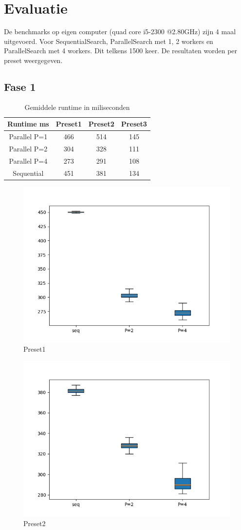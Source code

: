 \documentclass[]{article}
\begin{document}
\section{Evaluatie}
De benchmarks op eigen computer (quad core i5-2300 @2.80GHz) zijn 4 maal uitgevoerd. Voor SequentialSearch, ParallelSearch met 1, 2 workers en ParallelSearch met 4 workers. Dit telkens 1500 keer. De resultaten worden per preset weergegeven.

\subsection{Fase 1}

\begin{table}[h!]
	\centering
\begin{tabular}{|c|c|c|c|}
	\hline 
	Runtime ms & Preset1 & Preset2 & Preset3 \\ 
	\hline 
	Parallel P=1 & 466 & 514 & 145 \\ 
	\hline 
	Parallel P=2 & 304 & 328 & 111 \\ 
	\hline 
	Parallel P=4 & 273 & 291 & 108 \\ 
	\hline 
	Sequential & 451 & 381 & 134 \\ 
	\hline 
\end{tabular}
\caption{Gemiddele runtime in miliseconden}
\label{table:1}
\end{table}

\begin{figure}
	\centering
	\includegraphics[width=0.7\linewidth]{Preset_1}
	\caption[Preset1]{Preset1}
	\label{fig:preset1}
\end{figure}

\begin{figure}
	\centering
	\includegraphics[width=0.7\linewidth]{Preset_2}
	\caption[Preset1]{Preset2}
	\label{fig:preset2}
\end{figure}
\end{document}
